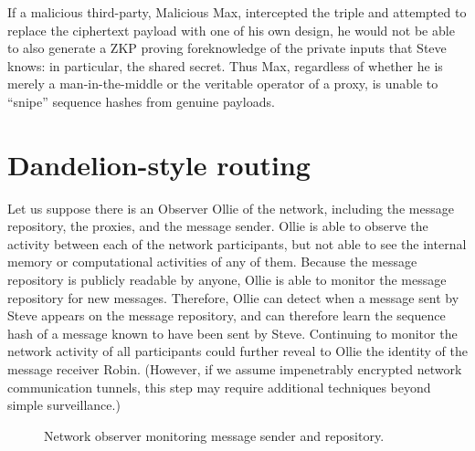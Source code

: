 If a malicious third-party, Malicious Max, intercepted the triple and attempted to replace the ciphertext payload with one of his own design, he would not be able to also generate a ZKP proving foreknowledge of the private inputs that Steve knows: in particular, the shared secret. Thus Max, regardless of whether he is merely a man-in-the-middle or the veritable operator of a proxy, is unable to ``snipe'' sequence hashes from genuine payloads.

\section{Dandelion-style routing}\label{dandelion-style-routing}

Let us suppose there is an Observer Ollie of the network, including the message repository, the proxies, and the message sender. Ollie is able to observe the activity between each of the network participants, but not able to see the internal memory or computational activities of any of them. Because the message repository is publicly readable by anyone, Ollie is able to monitor the message repository for new messages. Therefore, Ollie can detect when a message sent by Steve appears on the message repository, and can therefore learn the sequence hash of a message known to have been sent by Steve. Continuing to monitor the network activity of all participants could further reveal to Ollie the identity of the message receiver Robin. (However, if we assume impenetrably encrypted network communication tunnels, this step may require additional techniques beyond simple surveillance.)

\begin{figure}[h!]
    \centering
    \caption{Network observer monitoring message sender and repository.}
    \label{fig:observer}
\end{figure}

